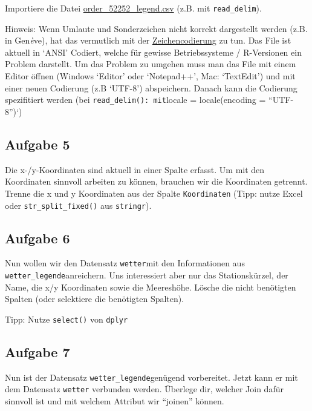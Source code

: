 \documentclass[]{book}
\begin{document}
Importiere die Datei \href{09_PrePro1/data/order_52252_legend.csv}{order\_52252\_legend.csv} (z.B. mit \texttt{read\_delim}).

Hinweis: Wenn Umlaute und Sonderzeichen nicht korrekt dargestellt werden (z.B. in Gen\emph{è}ve), hat das vermutlich mit der \href{https://de.wikipedia.org/wiki/Zeichenkodierung}{Zeichencodierung} zu tun. Das File ist aktuell in `ANSI' Codiert, welche für gewisse Betriebssysteme / R-Versionen ein Problem darstellt. Um das Problem zu umgehen muss man das File mit einem Editor öffnen (Windows `Editor' oder `Notepad++', Mac: `TextEdit') und mit einer neuen Codierung (z.B `UTF-8') abspeichern. Danach kann die Codierung spezifitiert werden (bei \texttt{read\_delim():\ mit}locale = locale(encoding = ``UTF-8'')`)

\hypertarget{aufgabe-5-1}{%
\subsection{Aufgabe 5}\label{aufgabe-5-1}}

Die x-/y-Koordinaten sind aktuell in einer Spalte erfasst. Um mit den Koordinaten sinnvoll arbeiten zu können, brauchen wir die Koordinaten getrennt. Trenne die x und y Koordinaten aus der Spalte \texttt{Koordinaten} (Tipp: nutze Excel oder \texttt{str\_split\_fixed()} aus \texttt{stringr}).

\hypertarget{aufgabe-6-1}{%
\subsection{Aufgabe 6}\label{aufgabe-6-1}}

Nun wollen wir den Datensatz \texttt{wetter}mit den Informationen aus \texttt{wetter\_legende}anreichern. Uns interessiert aber nur das Stationskürzel, der Name, die x/y Koordinaten sowie die Meereshöhe. Lösche die nicht benötigten Spalten (oder selektiere die benötigten Spalten).

Tipp: Nutze \texttt{select()} von \texttt{dplyr}

\hypertarget{aufgabe-7-1}{%
\subsection{Aufgabe 7}\label{aufgabe-7-1}}

Nun ist der Datensatz \texttt{wetter\_legende}genügend vorbereitet. Jetzt kann er mit dem Datensatz \texttt{wetter} verbunden werden. Überlege dir, welcher Join dafür sinnvoll ist und mit welchem Attribut wir ``joinen'' können.
\end{document}
